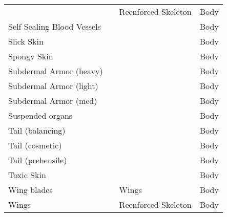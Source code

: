 \documentclass[twoside]{book}
\begin{document}
\begin{longtable}{p{1.25in}p{2em}ll}
  &
  
  &
   Reenforced Skeleton
           
  &
   Body 
  \tabularnewline
      
  \raggedright
           Self Sealing Blood Vessels
           
  &
  
  &
  
  &
   Body 
  \tabularnewline
      
  \raggedright
           Slick Skin 
  &
  
  &
  
  &
   Body 
  \tabularnewline
      
  \raggedright
           Spongy Skin 
  &
  
  &
  
  &
   Body 
  \tabularnewline
      
  \raggedright
           Subdermal Armor (heavy)
           
  &
  
  &
  
  &
   Body 
  \tabularnewline
      
  \raggedright
           Subdermal Armor (light)
           
  &
  
  &
  
  &
   Body 
  \tabularnewline
      
  \raggedright
           Subdermal Armor (med) 
  &
  
  &
  
  &
   Body 
  \tabularnewline
      
  \raggedright
           Suspended organs 
  &
  
  &
  
  &
   Body 
  \tabularnewline
      
  \raggedright
           Tail (balancing) 
  &
  
  &
  
  &
   Body 
  \tabularnewline
      
  \raggedright
           Tail (cosmetic) 
  &
  
  &
  
  &
   Body 
  \tabularnewline
      
  \raggedright
           Tail (prehensile) 
  &
  
  &
  
  &
   Body 
  \tabularnewline
      
  \raggedright
           Toxic Skin 
  &
  
  &
  
  &
   Body 
  \tabularnewline
      
  \raggedright
           Wing blades 
  &
  
  &
   Wings 
  &
   Body 
  \tabularnewline
      
  \raggedright
           Wings 
  &
  
  &
   Reenforced Skeleton
           
  &
   Body 
  \tabularnewline
      
\end{longtable}
    
\end{document}
